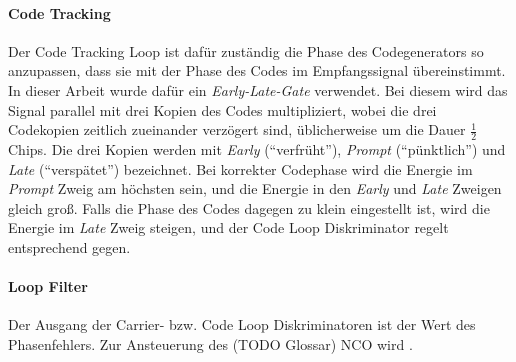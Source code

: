\paragraph{Code Tracking}
Der Code Tracking Loop ist dafür zuständig die Phase des Codegenerators so anzupassen, dass sie mit der Phase des Codes im Empfangssignal übereinstimmt. In dieser Arbeit wurde dafür ein \emph{Early-Late-Gate} verwendet. Bei diesem wird das Signal parallel mit drei Kopien des Codes multipliziert, wobei die drei Codekopien zeitlich zueinander verzögert sind, üblicherweise um die Dauer $\frac{1}{2}$ Chips. Die drei Kopien werden mit \emph{Early} (\enquote{verfrüht}), \emph{Prompt} (\enquote{pünktlich}) und \emph{Late} (\enquote{verspätet}) bezeichnet. Bei korrekter Codephase wird die Energie im \emph{Prompt} Zweig am höchsten sein, und die Energie in den \emph{Early} und \emph{Late} Zweigen gleich groß. Falls die Phase des Codes dagegen zu klein eingestellt ist, wird die Energie im \emph{Late} Zweig steigen, und der Code Loop Diskriminator regelt entsprechend gegen.

\paragraph{Loop Filter}
Der Ausgang der Carrier- bzw. Code Loop Diskriminatoren ist der Wert des Phasenfehlers. Zur Ansteuerung des (TODO Glossar) NCO wird .